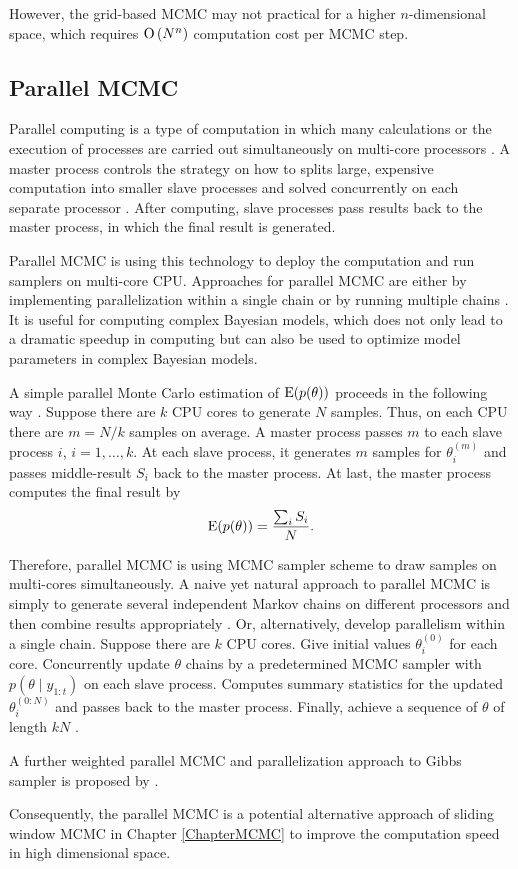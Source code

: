 However, the grid-based MCMC may not practical for a higher $n$-dimensional space, which requires ${\rm O}\left(N^n\right)$ computation cost per MCMC step. 


\subsection*{Parallel MCMC}

Parallel computing is a type of computation in which many calculations or the execution of processes are carried out simultaneously on multi-core processors \cite{asanovic2006landscape}. A master process controls the strategy on how to splits large, expensive computation into smaller slave processes and solved concurrently on each separate processor \cite{Almasi1994Highly}. After computing, slave processes pass results back to the master process, in which the final result is generated. 

Parallel MCMC is using this technology to deploy the computation and run samplers on multi-core CPU. Approaches for parallel MCMC are either by implementing parallelization within a single chain or by running multiple chains \cite{wu2012parallel}. It is useful for computing complex Bayesian models, which does not only lead to a dramatic speedup in computing but can also be used to optimize model parameters in complex Bayesian models.

A simple parallel Monte Carlo estimation of $\mathrm{E}(p(\theta))$ proceeds in the following way \cite{kontoghiorghes2005handbook}. Suppose there are $k$ CPU cores to generate $N$ samples. Thus, on each CPU there are $m=N/k$ samples on average. A master process passes $m$ to each slave process $i$, $i=1,\ldots,k$. At each slave process, it generates $m$ samples for $\theta_i^{(m)}$ and passes middle-result $S_i$ back to the master process. At last, the master process computes the final result by 
\begin{equation*}
\mathrm{E}(p(\theta))=\frac{\sum_i S_i}{N}. 
\end{equation*}

Therefore, parallel MCMC is using MCMC sampler scheme to draw samples on multi-cores simultaneously.  A naive yet natural approach to parallel MCMC is simply to generate several independent Markov chains on different
processors and then combine results appropriately \cite{bradford1996markov} \cite{gelman1992inference}. Or, alternatively, develop parallelism within a single chain. Suppose there are $k$ CPU cores. Give initial values $\theta_i^{(0)}$ for each core. Concurrently update $\theta$ chains by a predetermined MCMC sampler with $p(\theta\mid y_{1:t})$ on each slave process. Computes summary statistics for the updated $\theta_i^{(0: N)}$ and passes back to the master process. Finally, achieve a sequence of $\theta$ of length $kN$ \cite{wu2012parallel}. 

A further weighted parallel MCMC and parallelization approach to Gibbs sampler is proposed by \cite{vanderwerken2013parallel}.

Consequently, the parallel MCMC is a potential alternative approach of sliding window MCMC in Chapter \ref{ChapterMCMC} to improve the computation speed in high dimensional space. 


